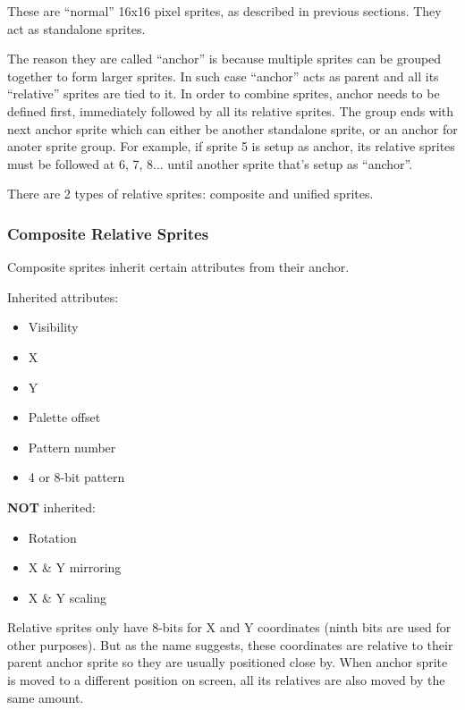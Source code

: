 \documentclass[12pt,twoside,openright,a4paper]{book}
\begin{document}
These are ``normal'' 16x16 pixel sprites, as described in previous sections. They act as standalone sprites.

The reason they are called ``anchor'' is because multiple sprites can be grouped together to form larger sprites. In such case ``anchor'' acts as parent and all its ``relative'' sprites are tied to it. In order to combine sprites, anchor needs to be defined first, immediately followed by all its relative sprites. The group ends with next anchor sprite which can either be another standalone sprite, or an anchor for anoter sprite group. For example, if sprite 5 is setup as anchor, its relative sprites must be followed at 6, 7, 8... until another sprite that's setup as ``anchor''.

There are 2 types of relative sprites: composite and unified sprites.

\subsubsection{Composite Relative Sprites}

Composite sprites inherit certain attributes from their anchor.

\begin{multicols}{2}
	 Inherited attributes:

	\begin{itemize}[topsep=1pt,itemsep=1pt]
		\item Visibility
		\item X
		\item Y
		\item Palette offset
		\item Pattern number
		\item 4 or 8-bit pattern 
	\end{itemize}

	\columnbreak

	\textbf{NOT} inherited:

	\begin{itemize}[topsep=1pt,itemsep=1pt]
		\item Rotation
		\item X \& Y mirroring
		\item X \& Y scaling
	\end{itemize}

\end{multicols}

Relative sprites only have 8-bits for X and Y coordinates (ninth bits are used for other purposes). But as the name suggests, these coordinates are relative to their parent anchor sprite so they are usually positioned close by. When anchor sprite is moved to a different position on screen, all its relatives are also moved by the same amount.
\end{document}

